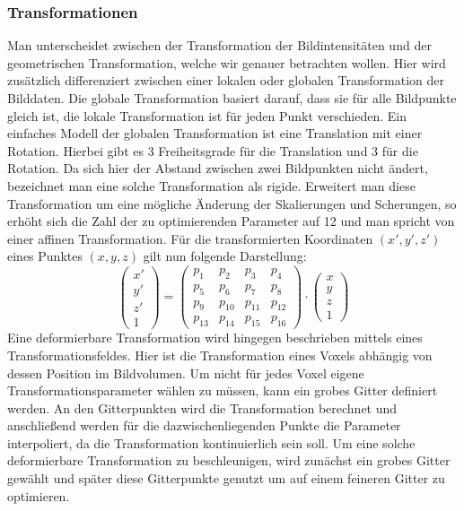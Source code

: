 \subsubsection{Transformationen}
Man unterscheidet zwischen der Transformation der Bildintensitäten und der
geometrischen Transformation, welche wir genauer betrachten wollen. Hier wird
zusätzlich differenziert zwischen einer lokalen oder globalen Transformation
der Bilddaten. Die globale Transformation basiert darauf, dass sie für alle
Bildpunkte gleich ist, die lokale Transformation ist für jeden Punkt
verschieden. Ein einfaches Modell der globalen Transformation ist eine
Translation mit einer Rotation. Hierbei gibt es 3 Freiheitsgrade für die
Translation und 3 für die Rotation. Da sich hier der Abstand zwischen zwei
Bildpunkten nicht ändert, bezeichnet man eine solche Transformation als rigide.
Erweitert man diese Transformation um eine mögliche Änderung der Skalierungen
und Scherungen, so erhöht sich die Zahl der zu optimierenden Parameter auf 12
und man spricht von einer affinen Transformation. Für die transformierten
Koordinaten $(x',y',z')$ eines Punktes $(x,y,z)$ gilt nun folgende Darstellung:
\begin{equation}
  \begin{pmatrix}
    x' \\ y' \\ z' \\ 1
  \end{pmatrix}
  =
  \begin{pmatrix}
    p_1 & p_2 & p_3 & p_4 \\
    p_5 & p_6 & p_7 & p_8 \\
    p_9 & p_{10} & p_{11} & p_{12} \\
    p_{13} & p_{14} & p_{15} & p_{16}
  \end{pmatrix}
  \cdot
  \begin{pmatrix}
    x \\ y \\ z \\ 1
  \end{pmatrix}
\end{equation}
Eine deformierbare Transformation wird hingegen beschrieben mittels eines
Transformationsfeldes. Hier ist die Transformation eines Voxels abhängig von
dessen Position im Bildvolumen. Um nicht für jedes Voxel eigene
Transformationsparameter wählen zu müssen, kann ein grobes Gitter definiert
werden. An den Gitterpunkten wird die Transformation berechnet und anschließend
werden für die dazwischenliegenden Punkte die Parameter interpoliert, da die
Transformation kontinuierlich sein soll. Um eine solche deformierbare
Transformation zu beschleunigen, wird zunächst ein grobes Gitter gewählt und
später diese Gitterpunkte genutzt um auf einem feineren Gitter zu optimieren.
